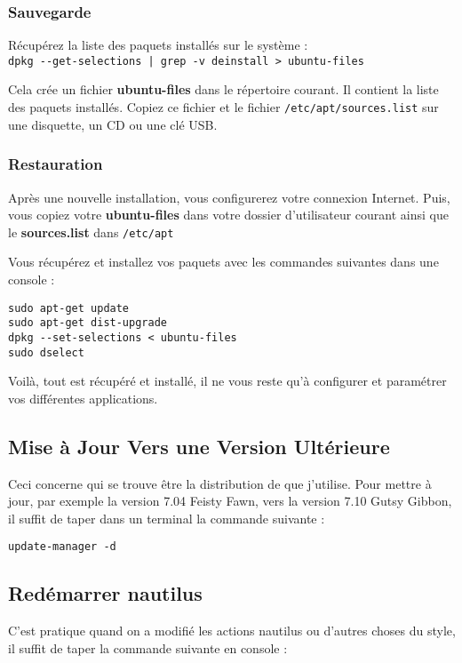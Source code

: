 \documentclass[a4paper,twoside]{article}
\begin{document}
\subsubsection{Sauvegarde}

Récupérez la liste des paquets installés sur le système :\\
\verb#dpkg --get-selections | grep -v deinstall > ubuntu-files#

Cela crée un fichier \textbf{ubuntu-files} dans le répertoire courant. Il contient la liste des paquets installés. Copiez ce fichier et le fichier \verb|/etc/apt/sources.list| sur une disquette, un CD ou une clé USB.
\subsubsection{Restauration}

Après une nouvelle installation, vous configurerez votre connexion Internet. Puis, vous copiez votre \textbf{ubuntu-files} dans votre dossier d'utilisateur courant ainsi que le \textbf{sources.list} dans \verb|/etc/apt|

Vous récupérez et installez vos paquets avec les commandes suivantes dans une console :

\begin{verbatim}
sudo apt-get update
sudo apt-get dist-upgrade
dpkg --set-selections < ubuntu-files
sudo dselect
\end{verbatim}

Voilà, tout est récupéré et installé, il ne vous reste qu'à configurer et paramétrer vos différentes applications.

\subsection{Mise à Jour Vers une Version Ultérieure}
Ceci concerne  qui se trouve être la distribution de  que j'utilise. Pour mettre à jour, par exemple la version 7.04 Feisty Fawn, vers la version 7.10 Gutsy Gibbon, il suffit de taper dans un terminal la commande suivante :

\verb|update-manager -d|

\subsection{Redémarrer nautilus}
C'est pratique quand on a modifié les actions nautilus ou d'autres choses du style, il suffit de taper la commande suivante en console :
\end{document}
